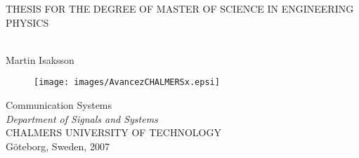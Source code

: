 \begin{titlepage}
\begin{center}

\textsc{\small{THESIS FOR THE DEGREE OF MASTER OF SCIENCE IN ENGINEERING PHYSICS}}

\vspace{3cm}

\textbf{\huge{\thesistitlebroken}}\\
\vspace{1.5cm} 
\LARGE{Martin Isaksson}

\vspace{3cm}

\begin{figure}[!h]
  \begin{center}
  \texttt{[image: images/AvancezCHALMERSx.epsi]}
  \end{center}
\end{figure}

\vspace{3.5cm}
\enlargethispage{2cm}
\normalsize{
Communication Systems\\
\textit{Department of Signals and Systems}\\
\textsc{CHALMERS UNIVERSITY OF TECHNOLOGY}\\
G\"{o}teborg, Sweden, 2007}
\end{center}
\end{titlepage}